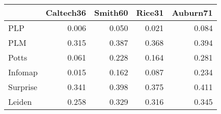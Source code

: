 \begin{tabular}{lrrrr}
\toprule
{} & Caltech36 & Smith60 & Rice31 & Auburn71 \\
\midrule
PLP      &     0.006 &   0.050 &  0.021 &    0.084 \\
PLM      &     0.315 &   0.387 &  0.368 &    0.394 \\
Potts    &     0.061 &   0.228 &  0.164 &    0.281 \\
Infomap  &     0.015 &   0.162 &  0.087 &    0.234 \\
Surprise &     0.341 &   0.398 &  0.375 &    0.411 \\
Leiden   &     0.258 &   0.329 &  0.316 &    0.345 \\
\bottomrule
\end{tabular}
